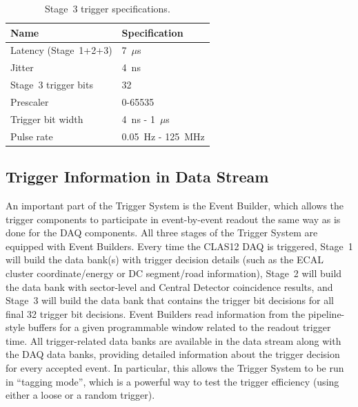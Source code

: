 \begin{table}
\begin{center}
	\begin{tabular}{| l | l |}
		\hline \hline
		Name				& Specification	\\
		\hline
		Latency (Stage~1+2+3)		& 7~$\mu$s	\\
		Jitter				& 4~ns		\\
		Stage~3 trigger bits		& 32		\\
		Prescaler			& 0-65535	\\
		Trigger bit width		& 4~ns - 1~$\mu$s	\\
		Pulse rate			& 0.05~Hz - 125~MHz	\\
		\hline \hline
	\end{tabular}
\end{center}
\caption{Stage~3 trigger specifications.}
\label{tab:stage_3_specs}
\end{table}

\subsection{Trigger Information in Data Stream}
\label{sec:trigger_in_datastream}

An important part of the Trigger System is the Event Builder, which allows the trigger components to
participate in event-by-event readout the same way as is done for the DAQ components. All three stages
of the Trigger System are equipped with Event Builders. Every time the CLAS12 DAQ is triggered, Stage~1
will build the data bank(s) with trigger decision details (such as the ECAL cluster coordinate/energy or DC
segment/road information), Stage~2 will build the data bank with sector-level and Central Detector
coincidence results, and Stage~3 will build the data bank that contains the trigger bit decisions for all final
32 trigger bit decisions. Event Builders read information from the pipeline-style buffers for a given
programmable window related to the readout trigger time. All trigger-related data banks are available in the
data stream along with the DAQ data banks, providing detailed information about the trigger decision for
every accepted event. In particular, this allows the Trigger System to be run in ``tagging mode'', which is a
powerful way to test the trigger efficiency (using either a loose or a random trigger).

